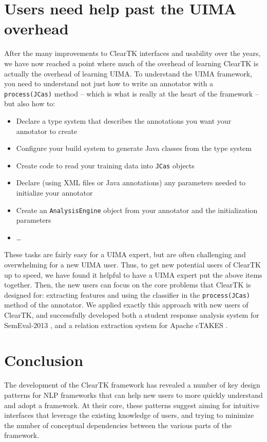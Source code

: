 \documentclass[10pt, a4paper]{article}
\newcommand{\code}[1]{\texttt{\small #1}}
\begin{document}
\section{Users need help past the UIMA overhead}
After the many improvements to ClearTK interfaces and usability over the years, we have now reached a point where much of the overhead of learning ClearTK is actually the overhead of learning UIMA.
To understand the UIMA framework, you need to understand not just how to write an annotator with a \code{process(JCas)} method -- which is what is really at the heart of the framework -- but also how to:
\begin{itemize}
\item Declare a type system that describes the annotations you want your annotator to create
\item Configure your build system to generate Java classes from the type system
\item Create code to read your training data into \code{JCas} objects
\item Declare (using XML files or Java annotations) any parameters needed to initialize your annotator
\item Create an \code{AnalysisEngine} object from your annotator and the initialization parameters
\item \ldots
\end{itemize}
These tasks are fairly easy for a UIMA expert, but are often challenging and overwhelming for a new UIMA user.
Thus, to get new potential users of ClearTK up to speed, we have found it helpful to have a UIMA expert put the above items together.
Then, the new users can focus on the core problems that ClearTK is designed for: extracting features and using the classifier in the \code{process(JCas)} method of the annotator.
We applied exactly this approach with new users of ClearTK, and successfully developed both a student response analysis system for SemEval-2013 \cite{okoye-bethard-sumner:2013:SemEval-2013}, and a relation extraction system for Apache cTAKES \cite{dligach2013discovering}.

\section{Conclusion}
The development of the ClearTK framework has revealed a number of key design patterns for NLP frameworks that can help new users to more quickly understand and adopt a framework.
At their core, these patterns suggest aiming for intuitive interfaces that leverage the existing knowledge of users, and trying to minimize the number of conceptual dependencies between the various parts of the framework.



\end{document}
